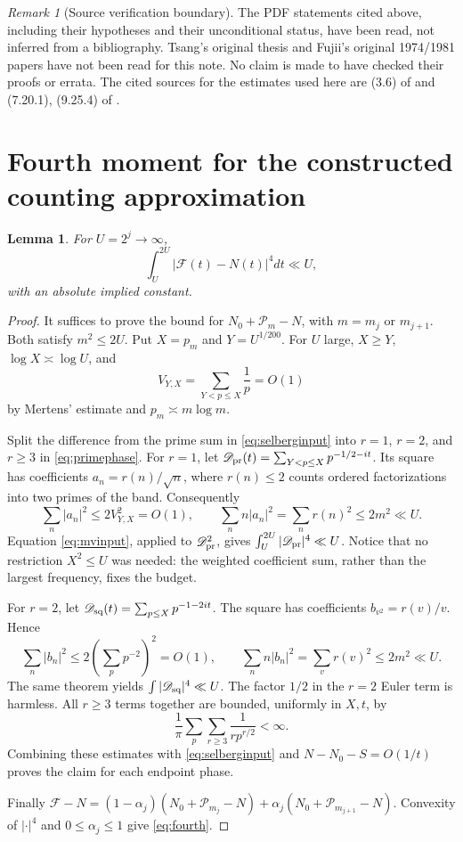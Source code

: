 \documentclass[11pt]{article}
\numberwithin{equation}{section}
\newtheorem{lemma}[theorem]{Lemma}
\theoremstyle{remark}
\newtheorem{remark}[theorem]{Remark}
\newcommand{\NO}{N_0}
\newcommand{\Ph}{\mathscr P}
\newcommand{\Fc}{\mathscr F}
\begin{document}
\begin{remark}[Source verification boundary]\label{rem:sources}
The PDF statements cited above, including their hypotheses and their
unconditional status, have been read, not inferred from a bibliography.
Tsang's original thesis and Fujii's original 1974/1981 papers have not
been read for this note. No claim is made to have checked their proofs
or errata. The cited sources for the estimates used here are (3.6) of
\cite{FGM} and (7.20.1), (9.25.4) of \cite{THB}.
\end{remark}

\section{Fourth moment for the constructed counting approximation}
\label{sec:fourth}
\begin{lemma}\label{lem:fourth}
For \(U=2^j\to\infty\),
\begin{equation}
 \int_U^{2U}|\Fc(t)-N(t)|^4dt\ll U,
 \label{eq:fourth}
\end{equation}
with an absolute implied constant.
\end{lemma}
\begin{proof}
It suffices to prove the bound for
\(\NO+\Ph_m-N\), with \(m=m_j\) or \(m_{j+1}\).
Both satisfy \(m^2\le2U\). Put \(X=p_m\) and \(Y=U^{1/200}\).
For \(U\) large, \(X\ge Y\), \(\log X\asymp\log U\), and
\[
 V_{Y,X}=\sum_{Y<p\le X}\frac1p=O(1)
\]
by Mertens' estimate and \(p_m\asymp m\log m\).

Split the difference from the prime sum in \eqref{eq:selberginput}
into \(r=1\), \(r=2\), and \(r\ge3\) in \eqref{eq:primephase}.
For \(r=1\), let
\(\mathscr D_{\rm pr}(t)=\sum_{Y<p\le X}p^{-1/2-it}\).
Its square has coefficients \(a_n=r(n)/\sqrt n\), where
\(r(n)\le2\) counts ordered factorizations into two primes of the band.
Consequently
\[
 \sum_n|a_n|^2\le2V_{Y,X}^2=O(1),\qquad
 \sum_n n|a_n|^2=\sum_n r(n)^2\le2m^2\ll U.
\]
Equation \eqref{eq:mvinput}, applied to \(\mathscr D_{\rm pr}^2\), gives
\(\int_U^{2U}|\mathscr D_{\rm pr}|^4\ll U\).
Notice that no restriction \(X^2\le U\) was needed: the weighted
coefficient sum, rather than the largest frequency, fixes the budget.

For \(r=2\), let \(\mathscr D_{\rm sq}(t)=\sum_{p\le X}p^{-1-2it}\).
The square has coefficients \(b_{v^2}=r(v)/v\). Hence
\[
 \sum_n|b_n|^2\le2\left(\sum_p p^{-2}\right)^2=O(1),
 \qquad
 \sum_n n|b_n|^2=\sum_v r(v)^2\le2m^2\ll U.
\]
The same theorem yields \(\int|\mathscr D_{\rm sq}|^4\ll U\).
The factor \(1/2\) in the \(r=2\) Euler term is harmless.
All \(r\ge3\) terms together are bounded, uniformly in \(X,t\), by
\[
 \frac1\pi\sum_p\sum_{r\ge3}\frac1{r p^{r/2}}<\infty.
\]
Combining these estimates with \eqref{eq:selberginput} and
\(N-\NO-S=O(1/t)\) proves the claim for each endpoint phase.

Finally \(\Fc-N=(1-\alpha_j)(\NO+\Ph_{m_j}-N)
+\alpha_j(\NO+\Ph_{m_{j+1}}-N)\). Convexity of \(|\cdot|^4\)
and \(0\le\alpha_j\le1\) give \eqref{eq:fourth}.
\end{proof}
\end{document}
